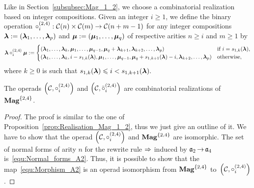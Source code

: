 Like in Section~\ref{subsubsec:Mag_1_2}, we choose a combinatorial
realization based on integer compositions. Given an integer $i \geq 1$,
we define the binary operation
\begin{math}
    \circ_i^{(2,4)} : \mathcal{C}(n) \times \mathcal{C}(m)
    \to\mathcal{C}(n + m - 1)
\end{math}
for any integer compositions
$\bm{\lambda} := \left(\bm{\lambda}_1, \dots, \bm{\lambda}_p\right)$ and
$\bm{\mu} := \left(\bm{\mu}_1, \dots, \bm{\mu}_q\right)$ of respective arities
$n \geq i$ and $m \geq 1$ by
\begin{equation}
    \bm{\lambda} \circ_i^{(2,4)} \bm{\mu} :=
    \begin{cases}
        \left(\bm{\lambda}_1, \dots, \bm{\lambda}_k,
        \bm{\mu}_1, \dots, \bm{\mu}_{q - 1}, \bm{\mu}_q + \bm{\lambda}_{k + 1},
        \bm{\lambda}_{k + 2}, \dots, \bm{\lambda}_p\right)
            & \mbox{if } i = s_{1, k}(\bm{\lambda}), \\
        \left(\bm{\lambda}_1, \dots, \bm{\lambda}_k,
        i - s_{1, k}(\bm{\lambda}), \bm{\mu}_1, \dots, \bm{\mu}_{q - 1},
        \bm{\mu}_q + s_{1, k+1}(\bm{\lambda}) - i, \bm{\lambda}_{k + 2}, \dots,
        \bm{\lambda}_p
        \right)
            & \mbox{otherwise},
    \end{cases}
\end{equation}
where $k \geq 0$ is such that
\begin{math}
    s_{1, k}(\bm{\lambda}) \leqslant i < s_{1, k+1}(\bm{\lambda}).
\end{math}
\medbreak

\begin{Proposition} \label{prop:Realisation_Mag_2_4}
    The operads $\left(\mathcal{C}, \circ_i^{(2,4)}\right)$
    and $\left(\mathcal{C}, \bar{\circ}_i^{(2,4)}\right)$
    are combinatorial realizations of~$\mathbf{Mag}^{\{2, 4\}}$.
\end{Proposition}
\begin{proof}
    The proof is similar to the one of
    Proposition~\ref{prop:Realisation_Mag_1_2}, thus we just give an
    outline of it.
    We have to show that the operad
    $\left(\mathcal{C}, \circ_i^{(2,4)}\right)$ and $\mathbf{Mag}^{\{2, 4\}}$
    are isomorphic. The set of normal forms of arity $n$ for the
    rewrite rule $\operatorname{\Rightarrow}$ induced by $\mathfrak{a}_2 \operatorname{\to} \mathfrak{a}_4$
    is~\eqref{equ:Normal_forms_A2}. Thus, it is possible to show that
    the map~\eqref{equ:Morphism_A2} is an operad isomorphism from
    $\mathbf{Mag}^{\{2, 4\}}$ to~$\left(\mathcal{C}, \circ_i^{(2,4)}\right)$.
\end{proof}
\medbreak

